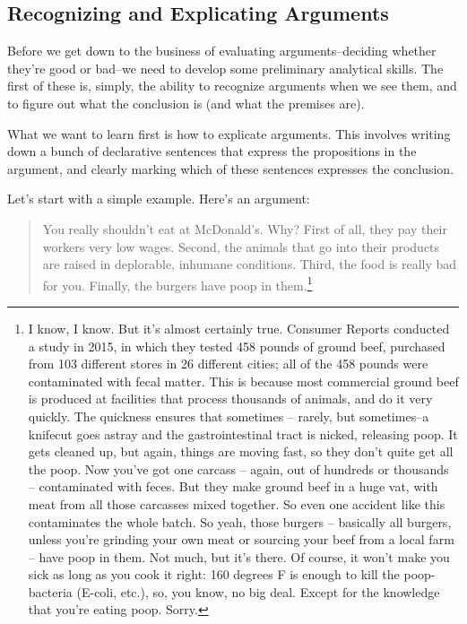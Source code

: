 \subsection{Recognizing and Explicating Arguments}
Before we get down to the business of evaluating arguments--deciding whether they're good or
bad--we need to develop some preliminary analytical skills. The first of these is, simply, the ability
to recognize arguments when we see them, and to figure out what the conclusion is (and what the
premises are).

What we want to learn first is how to explicate arguments. This involves writing down a bunch of
declarative sentences that express the propositions in the argument, and clearly marking which of
these sentences expresses the conclusion.

Let's start with a simple example. Here's an argument:

\begin{quote}
You really shouldn't eat at McDonald's. Why? First of all, they pay their workers very low
wages. Second, the animals that go into their products are raised in deplorable, inhumane
conditions. Third, the food is really bad for you. Finally, the burgers have poop in 
them.\footnote{I know, I know. But it's almost certainly true. Consumer Reports conducted a study in 2015, in which they tested
458 pounds of ground beef, purchased from 103 different stores in 26 different cities; all of the 458 pounds were
contaminated with fecal matter. This is because most commercial ground beef is produced at facilities that process
thousands of animals, and do it very quickly. The quickness ensures that sometimes -- 
rarely, but sometimes--a knifecut goes astray and the gastrointestinal tract is nicked, releasing poop. It gets cleaned up, but again, things are moving
fast, so they don't quite get all the poop. Now you've got one carcass -- again, out of hundreds or thousands --
contaminated with feces. But they make ground beef in a huge vat, with meat from all those carcasses mixed together.
So even one accident like this contaminates the whole batch. So yeah, those burgers -- basically all burgers, unless
you're grinding your own meat or sourcing your beef from a local farm -- have poop in them. Not much, but it's there.
Of course, it won't make you sick as long as you cook it right: 160 degrees F is enough to kill the poop-bacteria (E-coli, etc.),
so, you know, no big deal. Except for the knowledge that you're eating poop. Sorry.}
\end{quote}

